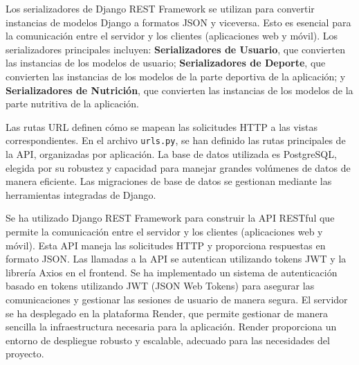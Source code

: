 Los serializadores  de Django REST Framework se utilizan para convertir instancias de modelos Django a formatos JSON y viceversa. Esto es esencial para la comunicación entre el servidor y los clientes (aplicaciones web y móvil). Los serializadores principales incluyen: \textbf{Serializadores de Usuario}, que convierten las instancias de los modelos de usuario; \textbf{Serializadores de Deporte}, que convierten las instancias de los modelos de la parte deportiva de la aplicación; y \textbf{Serializadores de Nutrición}, que convierten las instancias de los modelos de la parte nutritiva de la aplicación.

Las rutas URL  definen cómo se mapean las solicitudes HTTP a las vistas correspondientes. En el archivo \texttt{urls.py}, se han definido las rutas principales de la API, organizadas por aplicación. La base de datos  utilizada es PostgreSQL, elegida por su robustez y capacidad para manejar grandes volúmenes de datos de manera eficiente. Las migraciones de base de datos se gestionan mediante las herramientas integradas de Django.

Se ha utilizado Django REST Framework para construir la API RESTful  que permite la comunicación entre el servidor y los clientes (aplicaciones web y móvil). Esta API maneja las solicitudes HTTP y proporciona respuestas en formato JSON. Las llamadas a la API  se autentican utilizando tokens JWT \cite{JWT} y la librería Axios \cite{Axios} en el frontend. Se ha implementado un sistema de autenticación basado en tokens utilizando JWT (JSON Web Tokens) para asegurar las comunicaciones y gestionar las sesiones de usuario de manera segura. El servidor se ha desplegado en la plataforma Render, que permite gestionar de manera sencilla la infraestructura necesaria para la aplicación. Render proporciona un entorno de despliegue robusto y escalable, adecuado para las necesidades del proyecto.